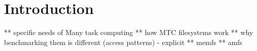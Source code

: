 
\chapter{Introduction} %

\label{Chapter1} %



** specific needs of Many task computing
** how MTC filesystems work
** why benchmarking them is different (access patterns) - explicit
** memfs
** amfs
